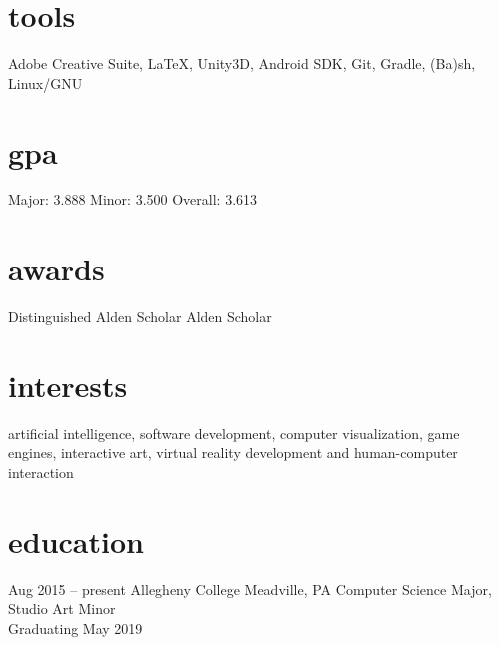 \documentclass[]{friggeri-cv}
\begin{document}
\begin{aside}
  \section{tools}\vspace{0.05cm}
    Adobe Creative Suite, \LaTeX , Unity3D, Android SDK, Git, Gradle, (Ba)sh, Linux/GNU
  \section{gpa}\vspace{0.1cm}
  	Major: 3.888
  	Minor: 3.500
    Overall: 3.613\vspace{0.1cm}
  \section{awards}\vspace{0.05cm}
  Distinguished Alden Scholar\vspace{0.1cm}
  Alden Scholar\vspace{0.1cm}
\end{aside}

\section{interests}

artificial intelligence, software development, computer visualization, game engines, interactive art, virtual reality development and human-computer interaction

\section{education}
\begin{entrylist}
  \entry
    {Aug 2015 -- present}
    {Allegheny College}
    {Meadville, PA}
    {Computer Science Major, Studio Art Minor\\Graduating May 2019}
\end{entrylist}
\end{document}
